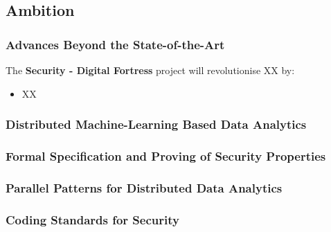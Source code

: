 \documentclass[a4paper,11pt]{article}
\newcommand{\project}[1]{\textbf{#1}\xspace}
\newcommand{\SECURITY}{\project{Security - Digital Fortress}}
\newcommand{\TheProject}{\SECURITY}
\begin{document}
\subsection{Ambition}


\subsubsection{Advances Beyond the State-of-the-Art}
\label{sec:novelty}
\label{sect:background}
\label{sect:state-of-the-art}




The \TheProject{} project will revolutionise XX by:
\begin{itemize}
\item XX
\end{itemize}

\subsubsection{Distributed Machine-Learning Based Data Analytics}
\label{sect:background-first}
\label{sect:distAnalytics}

\subsubsection{Formal Specification and Proving of Security Properties}
\label{sect:formal}

\subsubsection{Parallel Patterns for Distributed Data Analytics}
\label{sect:patterns}

\subsubsection{Coding Standards for Security}
\label{sect:codingStandards}
\end{document}
